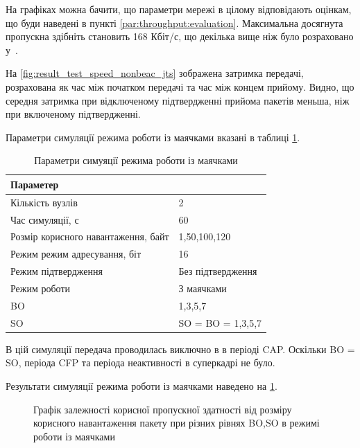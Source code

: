 \documentclass[a4paper,ukrainian,utf8,nocolumnsxix,floatsection,equationsection]{eskdtext}
\begin{document}
На графіках можна бачити, що параметри мережі в цілому відповідають оцінкам, що буди наведені в пункті \ref{par:throughput:evaluation}. Максимальна досягнута пропускна здібніть становить 168 Кбіт/с, що декілька вище ніж було розраховано у~\cite{thoroughput:analysis:unslotted:ieee}. 

На \cref{fig:result_test_speed_nonbeac_jts} зображена затримка передачі, розрахована як час між початком передачі та час між концем прийому. Видно, що середня затримка при відключеному підтвердженні прийома пакетів меньша, ніж при включеному підтвердженні.

	
	\clearpage
Параметри симуляції режима роботи із маячками вказані в таблиці \ref{tbl:simulation_settings_beackon_cap}. 

\begin{table}[htbp]
\caption{Параметри симуяції режима роботи із маячками}
\centering
\begin{tabular}{|l|l|}
	\hline
	Параметер                           &                   \\ \hline
	Кількість вузлів                    & 2                 \\ \hline
	Час симуляції, с                    & 60                \\ \hline
	Розмір корисного навантаження, байт & 1,50,100,120      \\ \hline
	Режим режим адресування, біт        & 16                \\ \hline
	Режим підтвердження                 & Без підтвердження \\ \hline
	Режим роботи                        & З маячками        \\ \hline
	BO                                  & 1,3,5,7           \\ \hline
	SO                                  & SO = BO = 1,3,5,7 \\ \hline
\end{tabular}
\label{tbl:simulation_settings_beackon_cap}
\end{table}

В цій симуляції передача проводилась виключно в в періоді CAP. Оскільки BO = SO, періода CFP та періода неактивності в суперкадрі не було.

Результати симуляції режима роботи із маячками наведено на \cref{fig:result_tp_beacon}.

\begin{figure}[bth]
	\centering
	\caption{\label{fig:result_tp_beacon}Графік залежності корисної пропускної здатності від розміру корисного навантаження пакету при різних рівнях BO,SO в режимі роботи із маячками}
\end{figure}
\end{document}
